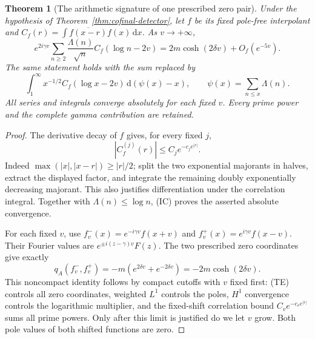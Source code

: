 \documentclass[11pt]{article}
\newtheorem{theorem}{Theorem}
\theoremstyle{remark}\newtheorem{remark}[theorem]{Remark}
\newcommand{\dd}{\,\mathrm d}
\begin{document}
\begin{theorem}[The arithmetic signature of one prescribed zero pair]
\label{thm:individual-prime-signature}
Under the hypothesis of Theorem~\ref{thm:cofinal-detector}, let
$f$ be its fixed pole-free interpolant and
$C_f(r)=\int\overline{f(x-r)}f(x)\dd x$.
As $v\to+\infty$,
\[
 e^{2i\gamma v}\sum_{n\ge2}\frac{\Lambda(n)}{\sqrt n}
                             C_f(\log n-2v)
             =2m\cosh(2\delta v)+O_f(e^{-5v}).           \tag{IS}
\]
The same statement holds with the sum replaced by
\[
 \int_1^\infty x^{-1/2}C_f(\log x-2v)
                              \dd(\psi(x)-x),\qquad
 \psi(x)=\sum_{n\le x}\Lambda(n).
\]
All series and integrals converge absolutely for each fixed $v$.
Every prime power and the complete gamma contribution are retained.
\end{theorem}
\begin{proof}
The derivative decay of $f$ gives, for every fixed $j$,
\[
 |C_f^{(j)}(r)|\le C_j e^{-c_j e^{|r|}}.
                                                               \tag{IC}
\]
Indeed $\max(|x|,|x-r|)\ge|r|/2$; split the two exponential
majorants in halves, extract the displayed factor, and integrate
the remaining doubly exponentially decreasing majorant.
This also justifies differentiation under the correlation integral.
Together with $\Lambda(n)\le\log n$, (IC) proves the asserted
absolute convergence.

For each fixed $v$, use
$f_v^-(x)=e^{-i\gamma v}f(x+v)$ and
$f_v^+(x)=e^{i\gamma v}f(x-v)$.
Their Fourier values are $e^{\pm i(z-\gamma)v}F(z)$.
The two prescribed zero coordinates give exactly
\[
 q_A(f_v^-,f_v^+)=-m(e^{2\delta v}+e^{-2\delta v})
                         =-2m\cosh(2\delta v).
\]
This noncompact identity follows by compact cutoffs with $v$
fixed first: (TE) controls all zero coordinates, weighted $L^1$
controls the poles, $H^1$ convergence controls the logarithmic
multiplier, and the fixed-shift correlation bound
$C_v e^{-c_v e^{|r|}}$ sums all prime powers.
Only after this limit is justified do we let $v$ grow.
Both pole values of both shifted functions are zero.


\end{proof}
\end{document}
